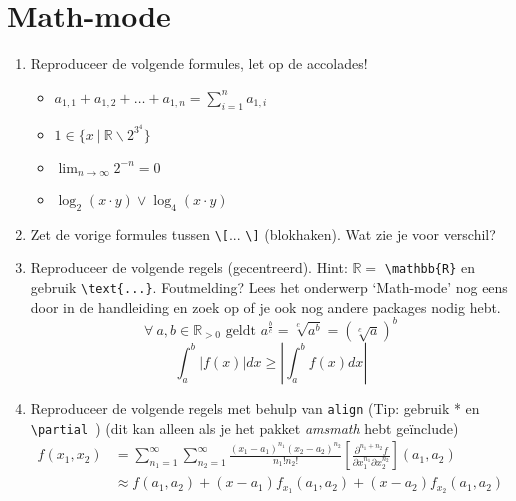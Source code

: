 \documentclass{article}
\begin{document}
\section{Math-mode}
\begin{enumerate}
	\item Reproduceer de volgende formules, let op de accolades!
	\begin{itemize}
		\renewcommand{\labelitemi}{\(\circ\)}
			\item\(a_{1,1} + a_{1,2} + \ldots + a_{1,n} = \sum_{i = 1}^n a_{1,i}\)\\
			\item\( 1 \in \{ x~|~\mathbb{R} \backslash 2^{3^4} \}\)\\
			\item\(\lim_{n \to \infty} 2^{-n} = 0\)\\
			\item\(\log_2(x\cdot y) \lor \log_4(x\cdot y)\)
		\end{itemize}
	\item Zet de vorige formules tussen \verb+\[+... \verb+\]+ (blokhaken). Wat zie je voor verschil? 
	\item Reproduceer de volgende regels (gecentreerd). Hint: $\mathbb{R} =$ \verb.\mathbb{R}. en gebruik \verb|\text{...}|.
Foutmelding? Lees het onderwerp `Math-mode' nog eens door in de handleiding en zoek op of je ook nog andere packages nodig hebt.
		\begin{equation}\forall \ a,b \in \mathbb{R}_{>0} \text{ geldt } a^{\frac{b}{c}} = \sqrt[c]{a^b} = \left(\sqrt[c]{a}\right)^b\end{equation}
		\begin{equation}\int_a^b |f(x)|dx \geq \left|\int_a^b f(x)dx\right|\end{equation}
	\item Reproduceer de volgende regels met behulp van \texttt{align} (Tip: gebruik * en \verb.\partial .) (dit kan alleen als je het pakket \emph{amsmath} hebt ge\"include)
			\begin{align*} 
			f(x_1,x_2) 	& = \sum_{n_1 = 1}^\infty \sum_{n_2 = 1}^\infty \frac{(x_1 - a_1)^{n_1}(x_2-a_2)^{n_2}}{n_1!n_2!} \left[ \frac{\partial^{n_1+n_2}f}{\partial x_1^{n_1} \partial x_2^{n_2}} \right] (a_1,a_2) \\
							    & \approx f(a_1,a_2) + (x-a_1)f_{x_1}(a_1,a_2) + (x-a_2)f_{x_2}(a_1,a_2) \\
			\end{align*}
\end{enumerate}
\end{document}
